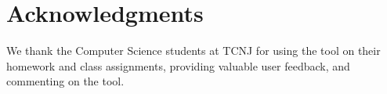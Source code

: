 \section*{Acknowledgments}
\label{sec:ack}

We thank the Computer Science students at TCNJ for using the tool on their
homework and class assignments, providing valuable user feedback, and
commenting on the tool.

